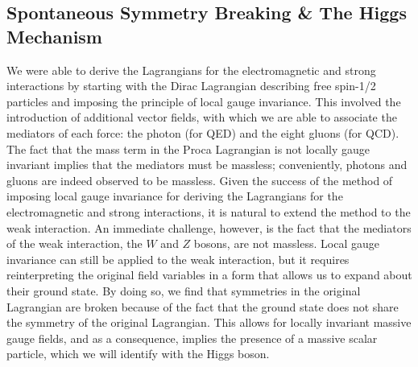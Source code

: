 \subsection{Spontaneous Symmetry Breaking \& The Higgs Mechanism} \label{sec:theory_ssbhm} 
We were able to derive the Lagrangians for the electromagnetic and strong interactions by starting with the Dirac Lagrangian describing free spin-1/2 particles and imposing the principle of local gauge invariance.
This involved the introduction of additional vector fields, with which we are able to associate the mediators of each force: the photon (for QED) and the eight gluons (for QCD).
The fact that the mass term in the Proca Lagrangian is not locally gauge invariant implies that the mediators must be massless; conveniently, photons and gluons are indeed observed to be massless.
Given the success of the method of imposing local gauge invariance for deriving the Lagrangians for the electromagnetic and strong interactions, it is natural to extend the method to the weak interaction.
An immediate challenge, however, is the fact that the mediators of the weak interaction, the $W$ and $Z$ bosons, are not massless.
Local gauge invariance can still be applied to the weak interaction, but it requires reinterpreting the original field variables in a form that allows us to expand about their ground state.
By doing so, we find that symmetries in the original Lagrangian are broken because of the fact that the ground state does not share the symmetry of the original Lagrangian.
This allows for locally invariant massive gauge fields, and as a consequence, implies the presence of a massive scalar particle, which we will identify with the Higgs boson.

